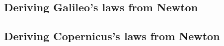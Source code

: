 
\subsection{Deriving Galileo's laws from Newton}

\subsection{Deriving Copernicus's laws from Newton}

